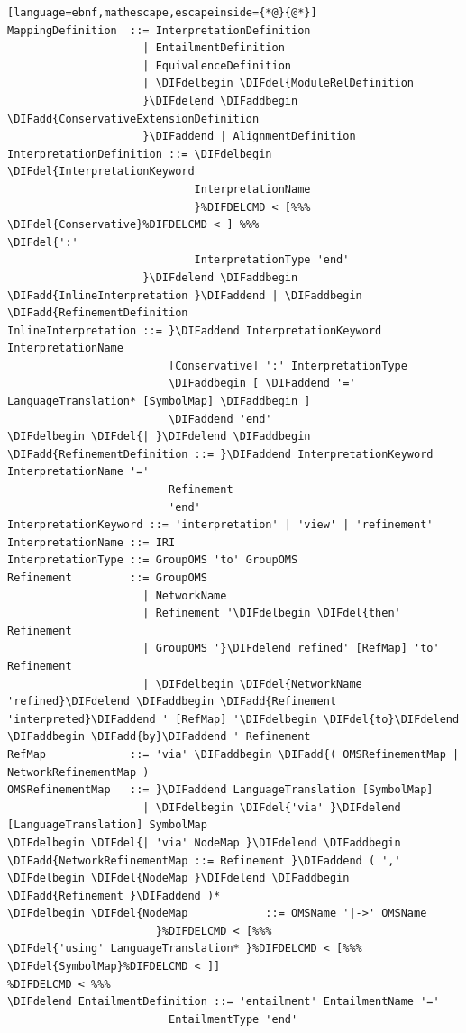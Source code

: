 \documentclass[10pt,fleqn,final]{scrreprt}
\newenvironment{definitions}[0]{\medskip }{}
\providecommand{\DIFadd}[1]{{\protect\color{blue}\uwave{#1}}} %
\providecommand{\DIFdel}[1]{{\protect\color{red}\sout{#1}}}                      %
\providecommand{\DIFaddbegin}{} %
\providecommand{\DIFaddend}{} %
\providecommand{\DIFdelbegin}{} %
\providecommand{\DIFdelend}{} %
\begin{document}
\begin{definitions}
\begin{lstlisting}[language=ebnf,mathescape,escapeinside={*@}{@*}]
MappingDefinition  ::= InterpretationDefinition
                     | EntailmentDefinition
                     | EquivalenceDefinition
                     | \DIFdelbegin \DIFdel{ModuleRelDefinition
                     }\DIFdelend \DIFaddbegin \DIFadd{ConservativeExtensionDefinition
                     }\DIFaddend | AlignmentDefinition
InterpretationDefinition ::= \DIFdelbegin \DIFdel{InterpretationKeyword
                             InterpretationName
                             }%DIFDELCMD < [%%%
\DIFdel{Conservative}%DIFDELCMD < ] %%%
\DIFdel{':'
                             InterpretationType 'end'
                     }\DIFdelend \DIFaddbegin \DIFadd{InlineInterpretation }\DIFaddend | \DIFaddbegin \DIFadd{RefinementDefinition
InlineInterpretation ::= }\DIFaddend InterpretationKeyword InterpretationName
                         [Conservative] ':' InterpretationType
                         \DIFaddbegin [ \DIFaddend '=' LanguageTranslation* [SymbolMap] \DIFaddbegin ]
                         \DIFaddend 'end'
\DIFdelbegin \DIFdel{| }\DIFdelend \DIFaddbegin \DIFadd{RefinementDefinition ::= }\DIFaddend InterpretationKeyword InterpretationName '='
                         Refinement
                         'end'
InterpretationKeyword ::= 'interpretation' | 'view' | 'refinement'
InterpretationName ::= IRI
InterpretationType ::= GroupOMS 'to' GroupOMS
Refinement         ::= GroupOMS
                     | NetworkName
                     | Refinement '\DIFdelbegin \DIFdel{then' Refinement
                     | GroupOMS '}\DIFdelend refined' [RefMap] 'to' Refinement
                     | \DIFdelbegin \DIFdel{NetworkName 'refined}\DIFdelend \DIFaddbegin \DIFadd{Refinement 'interpreted}\DIFaddend ' [RefMap] '\DIFdelbegin \DIFdel{to}\DIFdelend \DIFaddbegin \DIFadd{by}\DIFaddend ' Refinement
RefMap             ::= 'via' \DIFaddbegin \DIFadd{( OMSRefinementMap | NetworkRefinementMap )
OMSRefinementMap   ::= }\DIFaddend LanguageTranslation [SymbolMap]
                     | \DIFdelbegin \DIFdel{'via' }\DIFdelend [LanguageTranslation] SymbolMap
\DIFdelbegin \DIFdel{| 'via' NodeMap }\DIFdelend \DIFaddbegin \DIFadd{NetworkRefinementMap ::= Refinement }\DIFaddend ( ',' \DIFdelbegin \DIFdel{NodeMap }\DIFdelend \DIFaddbegin \DIFadd{Refinement }\DIFaddend )*
\DIFdelbegin \DIFdel{NodeMap            ::= OMSName '|->' OMSName
                       }%DIFDELCMD < [%%%
\DIFdel{'using' LanguageTranslation* }%DIFDELCMD < [%%%
\DIFdel{SymbolMap}%DIFDELCMD < ]]
%DIFDELCMD < %%%
\DIFdelend EntailmentDefinition ::= 'entailment' EntailmentName '='
                         EntailmentType 'end'

\end{lstlisting}
\end{definitions}
\end{document}
